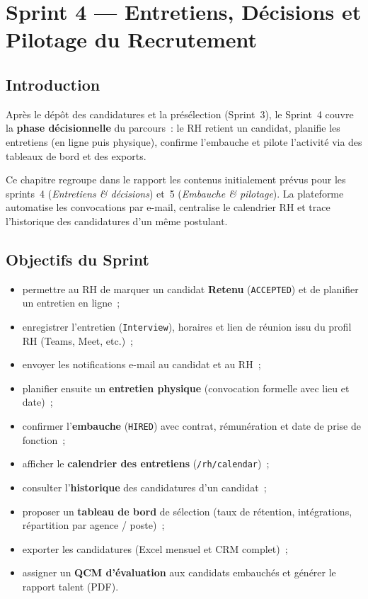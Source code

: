 \chapter{Sprint 4 --- Entretiens, Décisions et Pilotage du Recrutement}

\section{Introduction}

Après le dépôt des candidatures et la présélection (Sprint~3), le
Sprint~4 couvre la \textbf{phase décisionnelle} du parcours~: le RH
retient un candidat, planifie les entretiens (en ligne puis physique),
confirme l'embauche et pilote l'activité via des tableaux de bord et
des exports.

Ce chapitre regroupe dans le rapport les contenus initialement prévus
pour les sprints~4 (\emph{Entretiens \& décisions}) et~5
(\emph{Embauche \& pilotage}). La plateforme automatise les convocations
par e-mail, centralise le calendrier RH et trace l'historique des
candidatures d'un même postulant.


\section{Objectifs du Sprint}

\begin{itemize}
  \item permettre au RH de marquer un candidat \textbf{Retenu}
        (\texttt{ACCEPTED}) et de planifier un entretien en ligne~;
  \item enregistrer l'entretien (\texttt{Interview}), horaires et lien de
        réunion issu du profil RH (Teams, Meet, etc.)~;
  \item envoyer les notifications e-mail au candidat et au RH~;
  \item planifier ensuite un \textbf{entretien physique} (convocation
        formelle avec lieu et date)~;
  \item confirmer l'\textbf{embauche} (\texttt{HIRED}) avec contrat,
        rémunération et date de prise de fonction~;
  \item afficher le \textbf{calendrier des entretiens} (\texttt{/rh/calendar})~;
  \item consulter l'\textbf{historique} des candidatures d'un candidat~;
  \item proposer un \textbf{tableau de bord} de sélection (taux de
        rétention, intégrations, répartition par agence / poste)~;
  \item exporter les candidatures (Excel mensuel et CRM complet)~;
  \item assigner un \textbf{QCM d'évaluation} aux candidats embauchés et
        générer le rapport talent (PDF).
\end{itemize}


